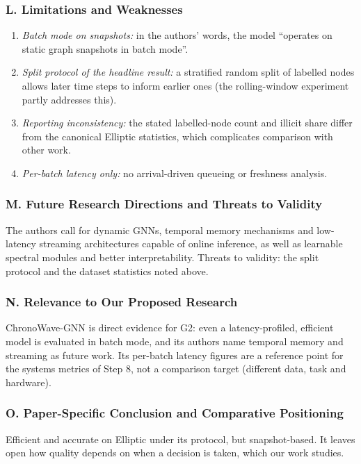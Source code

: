 \documentclass[11pt,a4paper]{article}
\begin{document}
\subsubsection*{L. Limitations and Weaknesses}
\begin{enumerate}[leftmargin=*]
    \item \textit{Batch mode on snapshots:} in the authors' words, the model ``operates on static graph snapshots in batch mode''.
    \item \textit{Split protocol of the headline result:} a stratified random split of labelled nodes allows later time steps to inform earlier ones (the rolling-window experiment partly addresses this).
    \item \textit{Reporting inconsistency:} the stated labelled-node count and illicit share differ from the canonical Elliptic statistics, which complicates comparison with other work.
    \item \textit{Per-batch latency only:} no arrival-driven queueing or freshness analysis.
\end{enumerate}

\subsubsection*{M. Future Research Directions and Threats to Validity}
The authors call for dynamic GNNs, temporal memory mechanisms and low-latency streaming architectures capable of online inference, as well as learnable spectral modules and better interpretability. Threats to validity: the split protocol and the dataset statistics noted above.

\subsubsection*{N. Relevance to Our Proposed Research}
ChronoWave-GNN is direct evidence for G2: even a latency-profiled, efficient model is evaluated in batch mode, and its authors name temporal memory and streaming as future work. Its per-batch latency figures are a reference point for the systems metrics of Step 8, not a comparison target (different data, task and hardware).

\subsubsection*{O. Paper-Specific Conclusion and Comparative Positioning}
Efficient and accurate on Elliptic under its protocol, but snapshot-based. It leaves open how quality depends on when a decision is taken, which our work studies.
\end{document}
